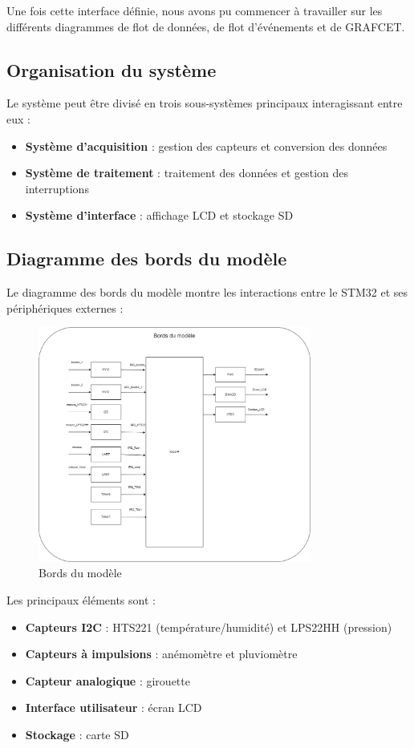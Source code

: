 \documentclass[12pt]{article}
\begin{document}
Une fois cette interface définie, nous avons pu commencer à travailler sur les différents diagrammes de flot de données, de flot d'événements et de GRAFCET.
\subsection{Organisation du système}
Le système peut être divisé en trois sous-systèmes principaux interagissant entre eux :
\begin{itemize}
    \item \textbf{Système d'acquisition} : gestion des capteurs et conversion des données
    \item \textbf{Système de traitement} : traitement des données et gestion des interruptions
    \item \textbf{Système d'interface} : affichage LCD et stockage SD
\end{itemize}

\subsection{Diagramme des bords du modèle}
Le diagramme des bords du modèle montre les interactions entre le STM32 et ses périphériques externes :

\begin{figure}[H]
    \capstart
    \centering
    \includegraphics[width=0.8\textwidth]{./images/bords_du_modele.drawio.png}
    \caption{Bords du modèle}
    \label{fig:bords}
\end{figure}

Les principaux éléments sont :
\begin{itemize}
    \item \textbf{Capteurs I2C} : HTS221 (température/humidité) et LPS22HH (pression)
    \item \textbf{Capteurs à impulsions} : anémomètre et pluviomètre
    \item \textbf{Capteur analogique} : girouette
    \item \textbf{Interface utilisateur} : écran LCD
    \item \textbf{Stockage} : carte SD
\end{itemize}
\end{document}
